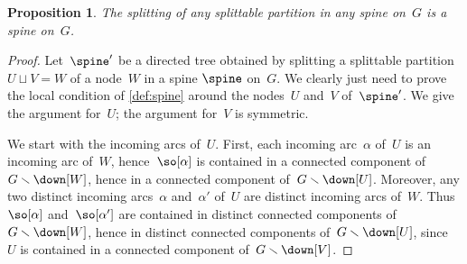 \documentclass{amsart}
\newtheorem{proposition}[theorem]{Proposition}
\theoremstyle{definition}
\newtheorem{remark}[theorem]{Remark}
\newcommand{\ssm}{\smallsetminus} %
\begin{document}
\begin{proposition}
  \label{prop:vertexsplitting} 
  The splitting of any splittable partition in any spine on~$G$ is a spine on~$G$.
\end{proposition}


\begin{proof}
  Let~$\spine'$ be a directed tree obtained by splitting a splittable partition~$U \sqcup V = W$ of a node~$W$ in a spine $\spine$ on~$G$.
  We clearly just need to prove the local condition of \cref{def:spine} around the nodes~$U$ and~$V$ of~$\spine'$.
  We give the argument for~$U$; the argument for~$V$ is symmetric.
  
  We start with the incoming arcs of~$U$.
  First, each incoming arc~$\alpha$ of~$U$ is an incoming arc of~$W$, hence~$\so[\alpha]$ is contained in a connected component of~$G \ssm \down[W]$, hence in a connected component of~$G \ssm \down[U]$.
  Moreover, any two distinct incoming arcs~$\alpha$ and~$\alpha'$ of~$U$ are distinct incoming arcs of~$W$. Thus~$\so[\alpha]$ and~$\so[\alpha']$ are contained in distinct connected components of~$G \ssm \down[W]$, hence in distinct connected components of~$G \ssm \down[U]$, since~$U$ is contained in a connected component of~$G \ssm \down[V]$.


\end{proof}
\end{document}
